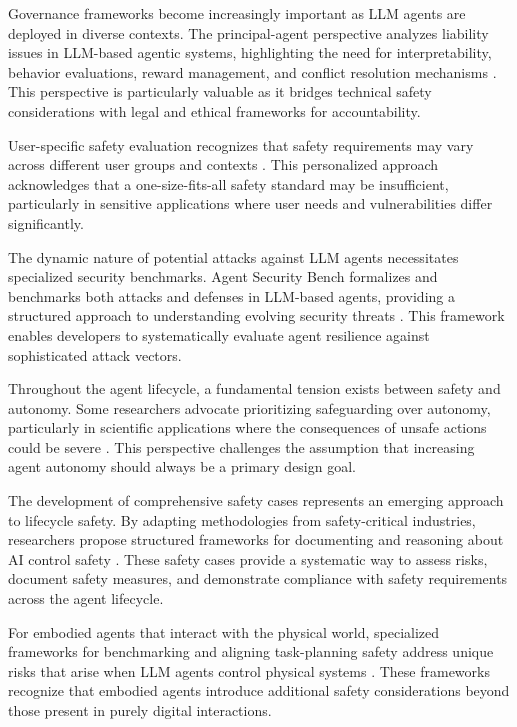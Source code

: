 \documentclass[conference]{IEEEtran}
\begin{document}
Governance frameworks become increasingly important as LLM agents are deployed in diverse contexts. The principal-agent perspective analyzes liability issues in LLM-based agentic systems, highlighting the need for interpretability, behavior evaluations, reward management, and conflict resolution mechanisms \cite{2504.03255}. This perspective is particularly valuable as it bridges technical safety considerations with legal and ethical frameworks for accountability.

User-specific safety evaluation recognizes that safety requirements may vary across different user groups and contexts \cite{2502.15086}. This personalized approach acknowledges that a one-size-fits-all safety standard may be insufficient, particularly in sensitive applications where user needs and vulnerabilities differ significantly.

The dynamic nature of potential attacks against LLM agents necessitates specialized security benchmarks. Agent Security Bench formalizes and benchmarks both attacks and defenses in LLM-based agents, providing a structured approach to understanding evolving security threats \cite{2410.02644}. This framework enables developers to systematically evaluate agent resilience against sophisticated attack vectors.

Throughout the agent lifecycle, a fundamental tension exists between safety and autonomy. Some researchers advocate prioritizing safeguarding over autonomy, particularly in scientific applications where the consequences of unsafe actions could be severe \cite{2402.04247}. This perspective challenges the assumption that increasing agent autonomy should always be a primary design goal.

The development of comprehensive safety cases represents an emerging approach to lifecycle safety. By adapting methodologies from safety-critical industries, researchers propose structured frameworks for documenting and reasoning about AI control safety \cite{2501.17315}. These safety cases provide a systematic way to assess risks, document safety measures, and demonstrate compliance with safety requirements across the agent lifecycle.

For embodied agents that interact with the physical world, specialized frameworks for benchmarking and aligning task-planning safety address unique risks that arise when LLM agents control physical systems \cite{2504.14650}. These frameworks recognize that embodied agents introduce additional safety considerations beyond those present in purely digital interactions.
\end{document}
